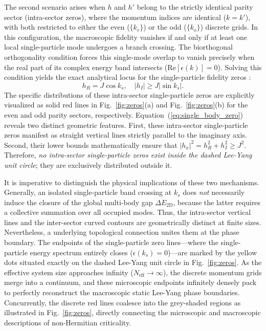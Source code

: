 \documentclass[aps,prb,floatfix,superscriptaddress,reprint]{revtex4-2}
\begin{document}
The second scenario arises when $h$ and $h'$ belong to the strictly identical parity sector (intra-sector zeros), where the momentum indices are identical ($k = k'$), with both restricted to either the even ($\{k_e\}$) or the odd ($\{k_o\}$) discrete grids. In this configuration, the macroscopic fidelity vanishes if and only if at least one local single-particle mode undergoes a branch crossing. The biorthogonal orthogonality condition forces this single-mode overlap to vanish precisely when the real part of its complex energy band intersects ($\mathrm{Re}[\epsilon(k)] = 0$). Solving this condition yields the exact analytical locus for the single-particle fidelity zeros \cite{Chen2026_1}:
\begin{equation}
    h_R = J \cos k_s, \quad |h_I| \ge J |\sin k_s|.
    \label{eq:single_body_zero}
\end{equation}
The specific distributions of these intra-sector single-particle zeros are explicitly visualized as solid red lines in Fig.~\ref{fig:zeros}(a) and Fig.~\ref{fig:zeros}(b) for the even and odd parity sectors, respectively. Equation~(\ref{eq:single_body_zero}) reveals two distinct geometric features. First, these intra-sector single-particle zeros manifest as straight vertical lines strictly parallel to the imaginary axis. Second, their lower bounds mathematically ensure that $|h_x|^2 = h_R^2 + h_I^2 \ge J^2$. Therefore, \textit{no intra-sector single-particle zeros exist inside the dashed Lee-Yang unit circle}; they are exclusively distributed outside it.



It is imperative to distinguish the physical implications of these two mechanisms. Generally, an isolated single-particle band crossing at $k_s$ does \textit{not} necessarily induce the closure of the global multi-body gap $\Delta E_{\mathrm{2D}}$, because the latter requires a collective summation over all occupied modes. Thus, the intra-sector vertical lines and the inter-sector curved contours are geometrically distinct at finite sizes. Nevertheless, a underlying topological connection unites them at the phase boundary. The endpoints of the single-particle zero lines---where the single-particle energy spectrum entirely closes ($\epsilon(k_s)=0$)---are marked by the yellow dots situated exactly on the dashed Lee-Yang unit circle in Fig.~\ref{fig:zeros}. As the effective system size approaches infinity ($N_{\mathrm{eff}} \to \infty$), the discrete momentum grids merge into a continuum, and these microscopic endpoints infinitely densely pack to perfectly reconstruct the macroscopic static Lee-Yang phase boundaries. Concurrently, the discrete red lines coalesce into the grey-shaded regions as illustrated in Fig.~\ref{fig:zeros}, directly connecting the microscopic and macroscopic descriptions of non-Hermitian criticality.
\end{document}
